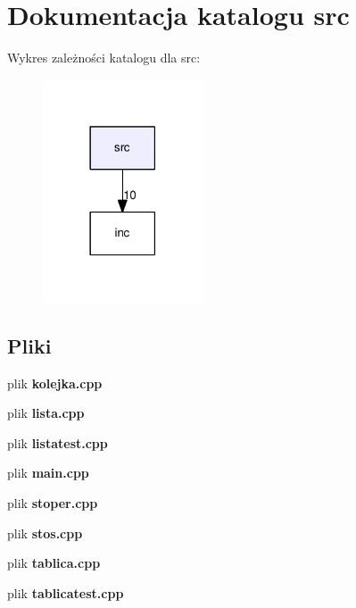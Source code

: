 \section{Dokumentacja katalogu src}
\label{dir_68267d1309a1af8e8297ef4c3efbcdba}
Wykres zależności katalogu dla src\+:
\nopagebreak
\begin{figure}[H]
\begin{center}
\leavevmode
\includegraphics[width=134pt]{dir_68267d1309a1af8e8297ef4c3efbcdba_dep}
\end{center}
\end{figure}
\subsection*{Pliki}
\begin{DoxyCompactItemize}
\item 
plik {\bfseries kolejka.\+cpp}
\item 
plik {\bfseries lista.\+cpp}
\item 
plik {\bfseries listatest.\+cpp}
\item 
plik {\bfseries main.\+cpp}
\item 
plik {\bfseries stoper.\+cpp}
\item 
plik {\bfseries stos.\+cpp}
\item 
plik {\bfseries tablica.\+cpp}
\item 
plik {\bfseries tablicatest.\+cpp}
\end{DoxyCompactItemize}
